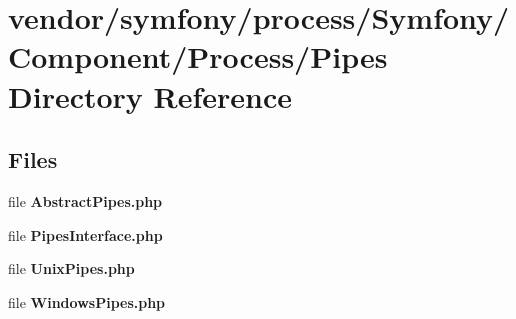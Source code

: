 \section{vendor/symfony/process/\+Symfony/\+Component/\+Process/\+Pipes Directory Reference}
\label{dir_e7b3ba9bcb4948701bb30c0fd5ab04d9}
\subsection*{Files}
\begin{DoxyCompactItemize}
\item 
file {\bf Abstract\+Pipes.\+php}
\item 
file {\bf Pipes\+Interface.\+php}
\item 
file {\bf Unix\+Pipes.\+php}
\item 
file {\bf Windows\+Pipes.\+php}
\end{DoxyCompactItemize}
